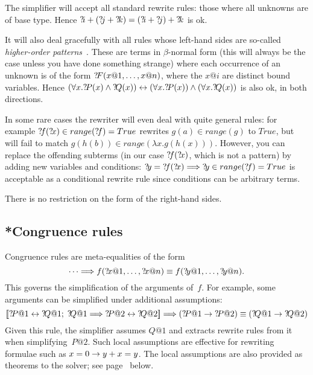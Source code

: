 \begin{warn}
The simplifier will accept all standard rewrite rules: those
where all unknowns are of base type.  Hence ${{?\!i}+({?\!j}+{?\!k})} =
{({?\!i}+{?\!j})+{?\!k}}$ is ok.

It will also deal gracefully with all rules whose left-hand sides are
so-called {\em higher-order patterns}~\cite{nipkow-patterns}. These are terms
in $\beta$-normal form (this will always be the case unless you have done
something strange) where each occurrence of an unknown is of the form
${?\!F}(x@1,\dots,x@n)$, where the $x@i$ are distinct bound variables.
Hence $(\forall x.{?\!P}(x) \land {?\!Q}(x)) \leftrightarrow (\forall x.{?\!P}(x))
\land (\forall x.{?\!Q}(x))$ is also ok, in both directions.

In some rare cases the rewriter will even deal with quite general rules: for
example ${{?\!f}({?\!x})\in range({?\!f})} = True$ rewrites $g(a) \in
range(g)$ to $True$, but will fail to match $g(h(b)) \in range(\lambda
x.g(h(x)))$. However, you can replace the offending subterms (in our case
${?\!f}({?\!x})$, which is not a pattern) by adding new variables and
conditions: ${?\!y} = {?\!f}({?\!x}) \Longrightarrow {?\!y}\in range({?\!f})
= True$ is acceptable as a conditional rewrite rule since conditions can
be arbitrary terms.

There is no restriction on the form of the right-hand sides.
\end{warn}


\subsection{*Congruence rules}
Congruence rules are meta-equalities of the form
\[ \dots \Longrightarrow
   f({?\!x@1},\ldots,{?\!x@n}) \equiv f({?\!y@1},\ldots,{?\!y@n}).
\]
This governs the simplification of the arguments of~$f$.  For
example, some arguments can be simplified under additional assumptions:
\[ \List{\Var{P@1} \bimp \Var{Q@1};\; \Var{Q@1} \Imp \Var{P@2} \bimp \Var{Q@2}}
   \Imp (\Var{P@1} \imp \Var{P@2}) \equiv (\Var{Q@1} \imp \Var{Q@2})
\]
Given this rule, the simplifier assumes $Q@1$ and extracts rewrite rules
from it when simplifying~$P@2$.  Such local assumptions are effective for
rewriting formulae such as $x=0\rightarrow y+x=y$.  The local assumptions are also
provided as theorems to the solver; see page~\pageref{sec:simp-solver} below.

